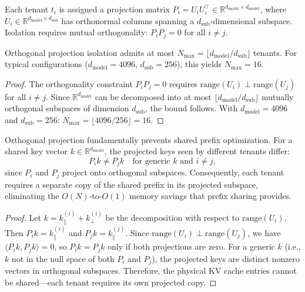 \begin{definition}
Each tenant $t_i$ is assigned a projection matrix $P_i = U_i U_i^\top \in \mathbb{R}^{d_{\mathrm{model}} \times d_{\mathrm{model}}}$,
where $U_i \in \mathbb{R}^{d_{\mathrm{model}} \times d_{\mathrm{sub}}}$ has orthonormal columns
spanning a $d_{\mathrm{sub}}$-dimensional subspace. Isolation requires mutual orthogonality:
$P_i P_j = 0$ for all $i \neq j$.
\end{definition}

\begin{proposition}
\label{prop:ortho-capacity}
Orthogonal projection isolation admits at most
$N_{\max} = \lfloor d_{\mathrm{model}} / d_{\mathrm{sub}} \rfloor$
tenants. For typical configurations ($d_{\mathrm{model}} = 4096$, $d_{\mathrm{sub}} = 256$),
this yields $N_{\max} = 16$.
\end{proposition}

\begin{proof}
The orthogonality constraint $P_i P_j = 0$ requires $\mathrm{range}(U_i) \perp \mathrm{range}(U_j)$
for all $i \neq j$. Since $\mathbb{R}^{d_{\mathrm{model}}}$ can be decomposed into at most
$\lfloor d_{\mathrm{model}} / d_{\mathrm{sub}} \rfloor$ mutually orthogonal subspaces
of dimension $d_{\mathrm{sub}}$, the bound follows. With $d_{\mathrm{model}} = 4096$ and
$d_{\mathrm{sub}} = 256$: $N_{\max} = \lfloor 4096 / 256 \rfloor = 16$.
\end{proof}

\begin{proposition}
\label{prop:ortho-prefix}
Orthogonal projection fundamentally prevents shared prefix optimization. For a shared
key vector $k \in \mathbb{R}^{d_{\mathrm{model}}}$, the projected keys seen by different
tenants differ:
\begin{equation}
    P_i k \neq P_j k \quad \text{for generic } k \text{ and } i \neq j,
\end{equation}
since $P_i$ and $P_j$ project onto orthogonal subspaces. Consequently, each tenant requires
a separate copy of the shared prefix in its projected subspace, eliminating the
$O(N)$-to-$O(1)$ memory savings that prefix sharing provides.
\end{proposition}

\begin{proof}
Let $k = k_\parallel^{(i)} + k_\perp^{(i)}$ be the decomposition with respect to
$\mathrm{range}(U_i)$. Then $P_i k = k_\parallel^{(i)}$ and $P_j k = k_\parallel^{(j)}$.
Since $\mathrm{range}(U_i) \perp \mathrm{range}(U_j)$, we have
$\langle P_i k, P_j k \rangle = 0$, so $P_i k = P_j k$ only if both projections are zero.
For a generic $k$ (i.e., $k$ not in the null space of both $P_i$ and $P_j$), the projected
keys are distinct nonzero vectors in orthogonal subspaces. Therefore, the physical KV cache
entries cannot be shared---each tenant requires its own projected copy.
\end{proof}

